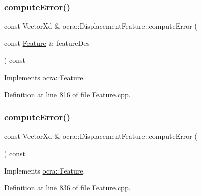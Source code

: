 \subsubsection{\texorpdfstring{compute\+Error()}{computeError()}\hspace{0.1cm}{\footnotesize\ttfamily [1/2]}}
{\footnotesize\ttfamily const Vector\+Xd \& ocra\+::\+Displacement\+Feature\+::compute\+Error (\begin{DoxyParamCaption}\item[{const \hyperlink{classocra_1_1Feature}{Feature} \&}]{feature\+Des }\end{DoxyParamCaption}) const\hspace{0.3cm}{\ttfamily [virtual]}}



Implements \hyperlink{classocra_1_1Feature_aaa74d6869f7e574fcc39d443581ddf77}{ocra\+::\+Feature}.



Definition at line 816 of file Feature.\+cpp.

\hypertarget{classocra_1_1DisplacementFeature_ac0520f1a870558227ba6d5339a243414}{}\label{classocra_1_1DisplacementFeature_ac0520f1a870558227ba6d5339a243414} 
\subsubsection{\texorpdfstring{compute\+Error()}{computeError()}\hspace{0.1cm}{\footnotesize\ttfamily [2/2]}}
{\footnotesize\ttfamily const Vector\+Xd \& ocra\+::\+Displacement\+Feature\+::compute\+Error (\begin{DoxyParamCaption}{ }\end{DoxyParamCaption}) const\hspace{0.3cm}{\ttfamily [virtual]}}



Implements \hyperlink{classocra_1_1Feature_a88f87b496aedc7bf9f13b19bb8f9c7fa}{ocra\+::\+Feature}.



Definition at line 836 of file Feature.\+cpp.

\hypertarget{classocra_1_1DisplacementFeature_afd5e272957274c46a6331c2a3d3324df}{}\label{classocra_1_1DisplacementFeature_afd5e272957274c46a6331c2a3d3324df} 
